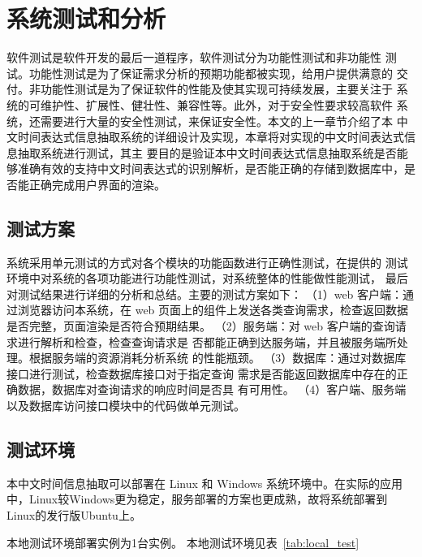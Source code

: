 
\chapter{系统测试和分析}

软件测试是软件开发的最后一道程序，软件测试分为功能性测试和非功能性
测试。功能性测试是为了保证需求分析的预期功能都被实现，给用户提供满意的
交付。非功能性测试是为了保证软件的性能及使其实现可持续发展，主要关注于
系统的可维护性、扩展性、健壮性、兼容性等。此外，对于安全性要求较高软件
系统，还需要进行大量的安全性测试，来保证安全性。本文的上一章节介绍了本
中文时间表达式信息抽取系统的详细设计及实现，本章将对实现的中文时间表达式信息抽取系统进行测试，其主
要目的是验证本中文时间表达式信息抽取系统是否能够准确有效的支持中文时间表达式的识别解析，是否能正确的存储到数据库中，是否能正确完成用户界面的渲染。

\section{测试方案}

系统采用单元测试的方式对各个模块的功能函数进行正确性测试，在提供的
测试环境中对系统的各项功能进行功能性测试，对系统整体的性能做性能测试，
最后对测试结果进行详细的分析和总结。主要的测试方案如下：
（1）web 客户端：通过浏览器访问本系统，在 web 页面上的组件上发送各类查询需求，检查返回数据是否完整，页面渲染是否符合预期结果。
（2）服务端：对 web 客户端的查询请求进行解析和检查，检查查询请求是
否都能正确到达服务端，并且被服务端所处理。根据服务端的资源消耗分析系统
的性能瓶颈。
（3）数据库：通过对数据库接口进行测试，检查数据库接口对于指定查询
需求是否能返回数据库中存在的正确数据，数据库对查询请求的响应时间是否具
有可用性。
（4）客户端、服务端以及数据库访问接口模块中的代码做单元测试。

\section{测试环境}

本中文时间信息抽取可以部署在 Linux 和 Windows 系统环境中。在实际的应用
中，Linux较Windows更为稳定，服务部署的方案也更成熟，故将系统部署到Linux的发行版Ubuntu上。

本地测试环境部署实例为1台实例。 本地测试环境见表~\ref{tab:local_test}

